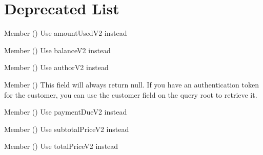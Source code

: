 \chapter{Deprecated List}
\hypertarget{deprecated}{}\label{deprecated}

\begin{DoxyRefList}
\item[Member \doxylink{class_shopify_1_1_unity_1_1_applied_gift_card_afcd6b4b303a48941cbbb1a78d812dac1}{Shopify.Unity.Applied\+Gift\+Card.amount\+Used} ()]\label{deprecated__deprecated000001}%
%
Use {\ttfamily amount\+Used\+V2} instead  
\item[Member \doxylink{class_shopify_1_1_unity_1_1_applied_gift_card_a25a5daa15bb9752fb1818534616f01cd}{Shopify.Unity.Applied\+Gift\+Card.balance} ()]\label{deprecated__deprecated000002}%
%
Use {\ttfamily balance\+V2} instead  
\item[Member \doxylink{class_shopify_1_1_unity_1_1_article_adc7873bee3b64c1f1406cc08daeaa04a}{Shopify.Unity.Article.author} ()]\label{deprecated__deprecated000003}%
%
Use {\ttfamily author\+V2} instead  
\item[Member \doxylink{class_shopify_1_1_unity_1_1_checkout_a8788d4d83bcb837264cb8511f2e4a198}{Shopify.Unity.Checkout.customer} ()]\label{deprecated__deprecated000004}%
%
This field will always return null. If you have an authentication token for the customer, you can use the {\ttfamily customer} field on the query root to retrieve it.  
\item[Member \doxylink{class_shopify_1_1_unity_1_1_checkout_aa1eaacf21d6797acd8d835de4bd061c6}{Shopify.Unity.Checkout.payment\+Due} ()]\label{deprecated__deprecated000005}%
%
Use {\ttfamily payment\+Due\+V2} instead  
\item[Member \doxylink{class_shopify_1_1_unity_1_1_checkout_a1d5423ee4fbeb61232a63832d806e35a}{Shopify.Unity.Checkout.subtotal\+Price} ()]\label{deprecated__deprecated000006}%
%
Use {\ttfamily subtotal\+Price\+V2} instead  
\item[Member \doxylink{class_shopify_1_1_unity_1_1_checkout_a393c3057f031c7a221e463d004decb88}{Shopify.Unity.Checkout.total\+Price} ()]\label{deprecated__deprecated000007}%
%
Use {\ttfamily total\+Price\+V2} instead  

\end{DoxyRefList}
